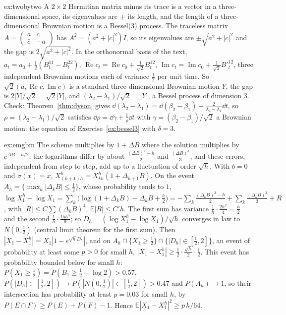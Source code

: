\begin{solution}{ex:twobytwo}
\idea A $2\times2$ Hermitian matrix minus its trace is a vector in a three-dimensional space, its eigenvalues are $\pm$ its length, and the length of a three-dimensional Brownian motion is a Bessel(3) process.
\writeup The traceless matrix $A=\begin{pmatrix}a&c\\\bar c&-a\end{pmatrix}$ has $A^2=(a^2+|c|^2)I$, so its eigenvalues are $\pm\sqrt{a^2+|c|^2}$ and the gap is $2\sqrt{a^2+|c|^2}$. In the orthonormal basis of the text,
$a_t=a_0+\frac12(B^{11}_t-B^{22}_t)$, $\operatorname{Re}c_t=\operatorname{Re}c_0+\frac1{\sqrt2}B^{12}_t$, $\operatorname{Im}c_t=\operatorname{Im}c_0+\frac1{\sqrt2}B'^{12}_t$,
three independent Brownian motions each of variance $\frac12$ per unit time. So $\sqrt2(a,\operatorname{Re}c,\operatorname{Im}c)$ is a standard three-dimensional Brownian motion $Y$, the gap is $2|Y|/\sqrt2=\sqrt2|Y|$, and
$(\lambda_2-\lambda_1)/\sqrt2=|Y|$, a Bessel process of dimension $3$. Check: Theorem~\ref{thm:dyson} gives $\dd(\lambda_2-\lambda_1)=\dd(\beta_2-\beta_1)+\frac2{\lambda_2-\lambda_1}\dd t$, so $\rho=(\lambda_2-\lambda_1)/\sqrt2$ satisfies
$\dd\rho=\dd\gamma+\frac1\rho\dd t$ with $\gamma=(\beta_2-\beta_1)/\sqrt2$ a Brownian motion: the equation of Exercise~\ref{ex:bessel3} with $\delta=3$.
\end{solution}

\begin{solution}{ex:emgbm}
\idea The scheme multiplies by $1+\Delta B$ where the solution multiplies by $e^{\Delta B-h/2}$; the logarithms differ by about $\frac{(\Delta B)^2-h}2$ and $\frac{(\Delta B)^3}3$, and these errors, independent from step
to step, add up to a fluctuation of order $\sqrt h$.
\writeup With $b=0$ and $\sigma(x)=x$, $X^h_{(k+1)h}=X^h_{kh}(1+\Delta_{k+1}B)$. On the event $A_h=\{\max_k|\Delta_kB|\le\frac12\}$, whose probability tends to $1$, $\log X^h_1-\log X_1=\sum_k\bigl(\log(1+\Delta_kB)-\Delta_kB+\frac h2\bigr)
=-\sum_k\frac{(\Delta_kB)^2-h}2+\sum_k\frac{(\Delta_kB)^3}3+R$, with $|R|\le C\sum(\Delta_kB)^4$, $\mathbb E|R|\le C'h$. The first sum has variance $\frac1h\cdot\frac{2h^2}4=\frac h2$ and the second $\frac1h\cdot\frac{15h^3}9$; so
$D_h=(\log X^h_1-\log X_1)/\sqrt h$ converges in law to $N(0,\frac12)$ (central limit theorem for the first sum). Then $|X_1-X^h_1|=X_1|1-e^{\sqrt hD_h}|$, and on $A_h\cap\{X_1\ge\frac12\}\cap\{|D_h|\in[\frac12,2]\}$, an event of probability
at least some $p>0$ for small $h$, $|X_1-X^h_1|\ge\frac12\cdot\frac{\sqrt h}2\cdot\frac12$. This event has probability bounded below for small $h$: $P(X_1\ge\frac12)=P(B_1\ge\frac12-\log2)>0.57$, $P(|D_h|\in[\frac12,2])\to P(|N(0,\frac12)|\in[\frac12,2])>0.47$ and $P(A_h)\to1$,
so their intersection has probability at least $p=0.03$ for small $h$, by $P(E\cap F)\ge P(E)+P(F)-1$. Hence $\mathbb E|X_1-X^h_1|^2\ge p\,h/64$.
\end{solution}

